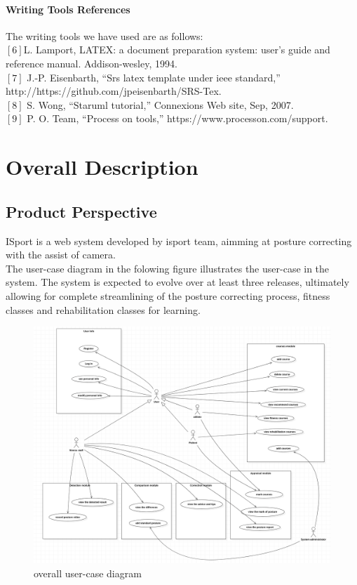 \documentclass[16pt]{scrreprt}
\begin{document}
\subsubsection{Writing Tools References}
The writing tools we have used are as follows:\\

$[6]$L. Lamport, LATEX: a document preparation system: user’s guide and reference manual. Addison-wesley, 1994.\\

$[7]$ J.-P. Eisenbarth, “Srs latex template under ieee standard,” \\http://https://github.com/jpeisenbarth/SRS-Tex.\\

$[8]$ S. Wong, “Staruml tutorial,” Connexions Web site, Sep, 2007.\\

$[9]$ P. O. Team, “Process on tools,” https://www.processon.com/support.

\chapter{Overall Description}
\label{Overall Description}

\section{Product Perspective}

ISport is a web system developed by isport team, aimming at posture correcting with the assist of camera.\\

The user-case diagram in the folowing figure illustrates the user-case in the system. The system is expected to evolve over at least three releases, ultimately allowing for complete streamlining of the posture correcting process, fitness classes and rehabilitation classes for learning.

\begin{figure}[H]
	\centering
	\includegraphics[width=1.0\textwidth]{figures/big-user-case.png}
	\caption{overall user-case diagram}
\end{figure}
\end{document}
